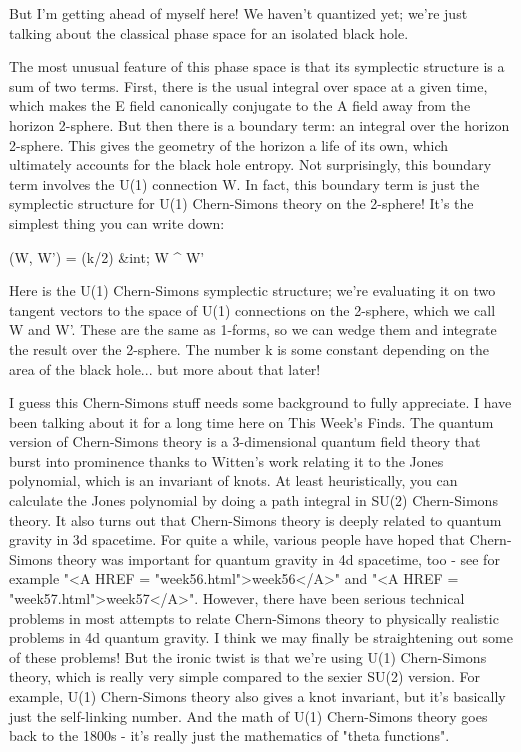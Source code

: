 But I'm getting ahead of myself here!  We haven't quantized yet; we're
just talking about the classical phase space for an isolated black hole.

The most unusual feature of this phase space is that its symplectic
structure is a sum of two terms.  First, there is the usual integral
over space at a given time, which makes the E field canonically
conjugate to the A field away from the horizon 2-sphere.  But then there
is a boundary term: an integral over the horizon 2-sphere.   This gives
the geometry of the horizon a life of its own, which ultimately accounts
for the black hole entropy.   Not surprisingly, this boundary term
involves the U(1) connection W.  In fact, this boundary term is just
the symplectic structure for U(1) Chern-Simons theory on the 2-sphere!
It's the simplest thing you can write down:

\omega (\delta  W, \delta  W') = (k/2\pi ) &int; \delta  W ^ \delta  W'

Here \omega  is the U(1) Chern-Simons symplectic structure; we're
evaluating it on two tangent vectors to the space of U(1) connections 
on the 2-sphere, which we call \delta  W and \delta  W'.  These are
the same as 1-forms, so we can wedge them and integrate the result
over the 2-sphere.  The number k is some constant depending on the
area of the black hole... but more about that later!  


I guess this Chern-Simons stuff needs some background to fully
appreciate.  I have been talking about it for a long time here on This
Week's Finds.  The quantum version of Chern-Simons theory is a
3-dimensional quantum field theory that burst into prominence thanks to
Witten's work relating it to the Jones polynomial, which is an invariant
of knots.  At least heuristically, you can calculate the Jones
polynomial by doing a path integral in SU(2) Chern-Simons theory.  It
also turns out that Chern-Simons theory is deeply related to quantum
gravity in 3d spacetime.  For quite a while, various people have hoped
that Chern-Simons theory was important for quantum gravity in 4d
spacetime, too - see for example "<A HREF =
"week56.html">week56</A>" and "<A HREF =
"week57.html">week57</A>".  However, there have been serious
technical problems in most attempts to relate Chern-Simons theory to
physically realistic problems in 4d quantum gravity.  I think we may
finally be straightening out some of these problems!  But the ironic
twist is that we're using U(1) Chern-Simons theory, which is really very
simple compared to the sexier SU(2) version.  For example, U(1)
Chern-Simons theory also gives a knot invariant, but it's basically just
the self-linking number.  And the math of U(1) Chern-Simons theory goes
back to the 1800s - it's really just the mathematics of "theta
functions".

